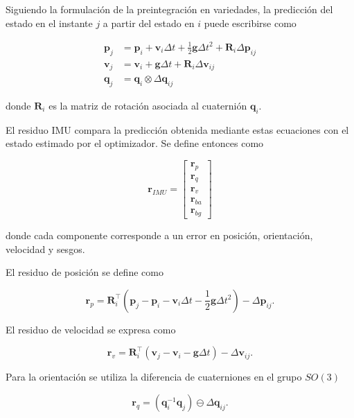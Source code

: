 Siguiendo la formulación de la preintegración en variedades, la predicción del estado en el instante $j$ a partir del estado en $i$ puede escribirse como

\begin{align}
\mathbf{p}_j &=
\mathbf{p}_i
+
\mathbf{v}_i \Delta t
+
\frac12 \mathbf{g} \Delta t^2
+
\mathbf{R}_i
\Delta \mathbf{p}_{ij}
\\
\mathbf{v}_j &=
\mathbf{v}_i
+
\mathbf{g}\Delta t
+
\mathbf{R}_i
\Delta \mathbf{v}_{ij}
\\
\mathbf{q}_j &=
\mathbf{q}_i
\otimes
\Delta \mathbf{q}_{ij}
\end{align}

\noindent donde $\mathbf{R}_i$ es la matriz de rotación asociada al cuaternión $\mathbf{q}_i$.

El residuo IMU compara la predicción obtenida mediante estas ecuaciones con el estado estimado por el optimizador. Se define entonces como

\begin{equation}
\mathbf{r}_{IMU}
=
\begin{bmatrix}
\mathbf{r}_p \\
\mathbf{r}_q \\
\mathbf{r}_v \\
\mathbf{r}_{ba} \\
\mathbf{r}_{bg}
\end{bmatrix}
\end{equation}

\noindent donde cada componente corresponde a un error en posición, orientación, velocidad y sesgos.

El residuo de posición se define como

\begin{equation}
\mathbf{r}_p =
\mathbf{R}_i^\top
\left(
\mathbf{p}_j
-
\mathbf{p}_i
-
\mathbf{v}_i \Delta t
-
\frac12 \mathbf{g}\Delta t^2
\right)
-
\Delta \mathbf{p}_{ij}.
\end{equation}

El residuo de velocidad se expresa como

\begin{equation}
\mathbf{r}_v =
\mathbf{R}_i^\top
\left(
\mathbf{v}_j
-
\mathbf{v}_i
-
\mathbf{g}\Delta t
\right)
-
\Delta \mathbf{v}_{ij}.
\end{equation}

Para la orientación se utiliza la diferencia de cuaterniones en el grupo $SO(3)$

\begin{equation}
\mathbf{r}_q =
(\mathbf{q}_i^{-1}\mathbf{q}_j)
\ominus
\Delta\mathbf{q}_{ij}.
\end{equation}

